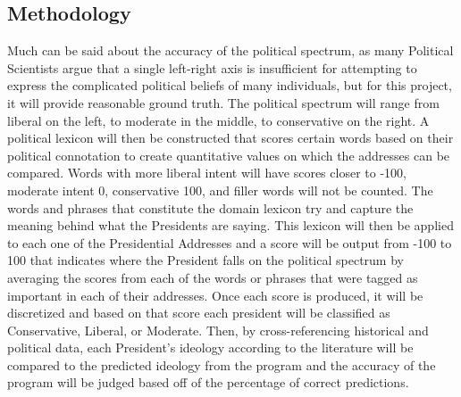\documentclass[reqno,12pt,oneside,letter]{report}
\begin{document}
\subsection*{Methodology}
Much can be said about the accuracy of the political spectrum, as many Political Scientists argue that a single left-right axis is insufficient for attempting to express the complicated political beliefs of many individuals, but for this project, it will provide reasonable ground truth. 
The political spectrum will range from liberal on the left, to moderate in the middle, to conservative on the right.
A political lexicon will then be constructed that scores certain words based on their political connotation to create quantitative values on which the addresses can be compared.
Words with more liberal intent will have scores closer to -100, moderate intent 0, conservative 100, and filler words will not be counted.
The words and phrases that constitute the domain lexicon try and capture the meaning behind what the Presidents are saying.
This lexicon will then be applied to each one of the Presidential Addresses and a score will be output from -100 to 100 that indicates where the President falls on the political spectrum by averaging the scores from each of the words or phrases that were tagged as important in each of their addresses.
Once each score is produced, it will be discretized and based on that score each president will be classified as Conservative, Liberal, or Moderate.
Then, by cross-referencing historical and political data, each President's ideology according to the literature will be compared to the predicted ideology from the program and the accuracy of the program will be judged based off of the percentage of correct predictions.
\end{document}

